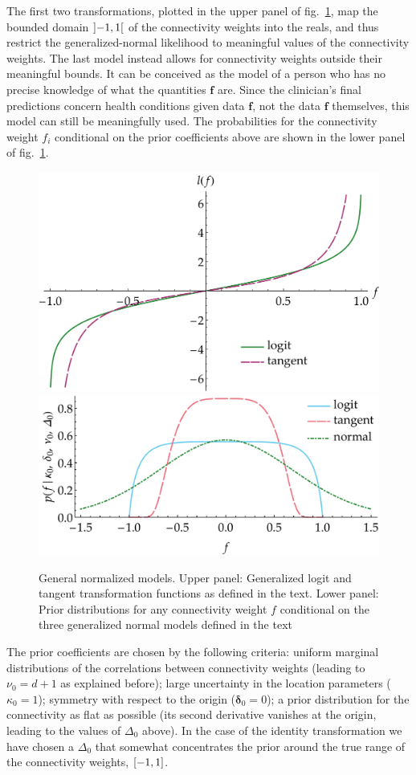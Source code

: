\documentclass[%
]{frontiersSCNS-nologo} %
\newcommand*{\fig}{fig.} %
\renewcommand*{\|}{\mathpunct{|}}%
\DeclarePairedDelimiter\clcl{[}{]}
\DeclarePairedDelimiter\opop{]}{[}
\newcommand*{\yxx}{f}
\newcommand*{\yx}{\bm{\yxx}}
\newcommand*{\yd}{d}
\newcommand*{\ymu}{\bm{\delta}}
\newcommand*{\yka}{\kappa}
\newcommand*{\ynu}{\nu}
\newcommand*{\yLa}{\bm{\varDelta}}
\newcommand*{\ymuo}{\ymu_0}
\newcommand*{\ykao}{\yka_0}
\newcommand*{\ynuo}{\ynu_0}
\newcommand*{\yLao}{\yLa_0}
\begin{document}
The first two transformations, plotted in the upper panel of
\fig~\ref{fig:logit_function}, map the bounded domain $\opop{-1,1}$ of the
connectivity weights into the reals, and thus restrict the
generalized-normal likelihood to meaningful values of the connectivity
weights. The last model instead allows for connectivity weights outside
their meaningful bounds. It can be conceived as the model of a person who
has no precise knowledge of what the quantities $\yx$ are. Since the
clinician's final predictions concern health conditions given data $\yx$,
not the data $\yx$ themselves, this model can still be meaningfully used.
The probabilities for the connectivity weight $\yxx_i$ conditional on the
prior coefficients above are shown in the lower panel of
\fig~\ref{fig:logit_function}.
\begin{figure}[!t]
  \centering
\includegraphics[width=0.75\linewidth]{logit-tangent.pdf}\\[10\jot]
\includegraphics[width=0.75\linewidth]{priors-new.pdf}
\caption{General normalized models. Upper panel: Generalized logit and tangent transformation
  functions as defined in the text. Lower panel: Prior distributions for
  any connectivity weight $\yxx$ conditional on the three generalized
  normal models defined in the text}
\label{fig:logit_function}
\end{figure}

The prior coefficients are chosen by the following criteria: uniform
marginal distributions of the correlations between connectivity weights (leading
to $\ynuo=\yd+1$ as explained before); large uncertainty in the location
parameters ($\ykao = 1$); symmetry with respect to the origin ($\ymuo=0$);
a prior distribution for the connectivity as flat as possible (its second
derivative vanishes at the origin, leading to the values of $\yLao$ above).
In the case of the identity transformation we have chosen a $\yLao$ that
somewhat concentrates the prior around the true range of the connectivity
weights, $\clcl{-1,1}$.
\end{document}
